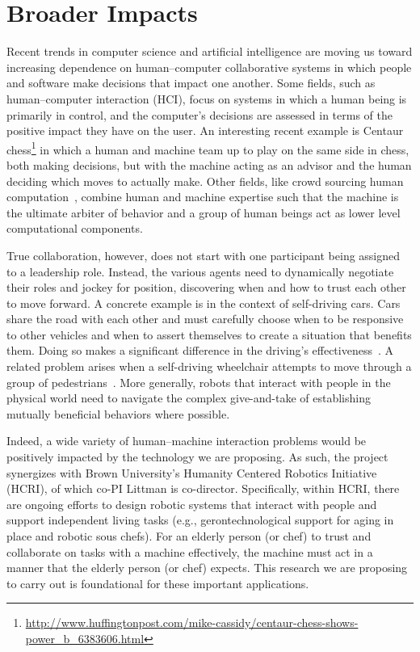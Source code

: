 
\section{Broader Impacts}

Recent trends in computer science and artificial intelligence are
moving us toward increasing dependence on human--computer
collaborative systems in which people and software make decisions that
impact one another.  Some fields, such as human--computer interaction
(HCI), focus on systems in which a human being is primarily in
control, and the computer's decisions are assessed in terms of the
positive impact they have on the user.  An interesting recent example
is Centaur
chess\footnote{\url{http://www.huffingtonpost.com/mike-cassidy/centaur-chess-shows-power_b_6383606.html}}
in which a human and machine team up to play on the same side in
chess, both making decisions, but with the machine acting as an
advisor and the human deciding which moves to actually make.  Other
fields, like crowd sourcing human computation~\cite{von2009human},
combine human and machine expertise such that the machine is the
ultimate arbiter of behavior and a group of human beings act as lower
level computational components.

True collaboration, however, does not start with one participant being
assigned to a leadership role.  Instead, the various agents need to
dynamically negotiate their roles and jockey for position, discovering
when and how to trust each other to move forward.  A concrete example
is in the context of self-driving cars.  Cars share the road with each
other and must carefully choose when to be responsive to other
vehicles and when to assert themselves to create a situation that
benefits them.  Doing so makes a significant difference in the
driving's effectiveness~\cite{cunningham2015mpdm}.  A related problem
arises when a self-driving wheelchair attempts to move through a group
of pedestrians~\cite{kim2016socially}.  More generally, robots that
interact with people in the physical world need to navigate the
complex give-and-take of establishing mutually beneficial behaviors
where possible.

Indeed, a wide variety of human--machine interaction problems would be
positively impacted by the technology we are proposing.
%
As such, the project synergizes with Brown University's Humanity
Centered Robotics Initiative (HCRI), of which co-PI Littman is
co-director.  Specifically, within HCRI, there are ongoing efforts to
design robotic systems that interact with people and support
independent living tasks (e.g., gerontechnological support for aging
in place and robotic sous chefs).  For an elderly person (or chef) to
trust and collaborate on tasks with a machine effectively, the machine
must act in a manner that the elderly person (or chef) expects.  This
research we are proposing to carry out is foundational for these
important applications.

